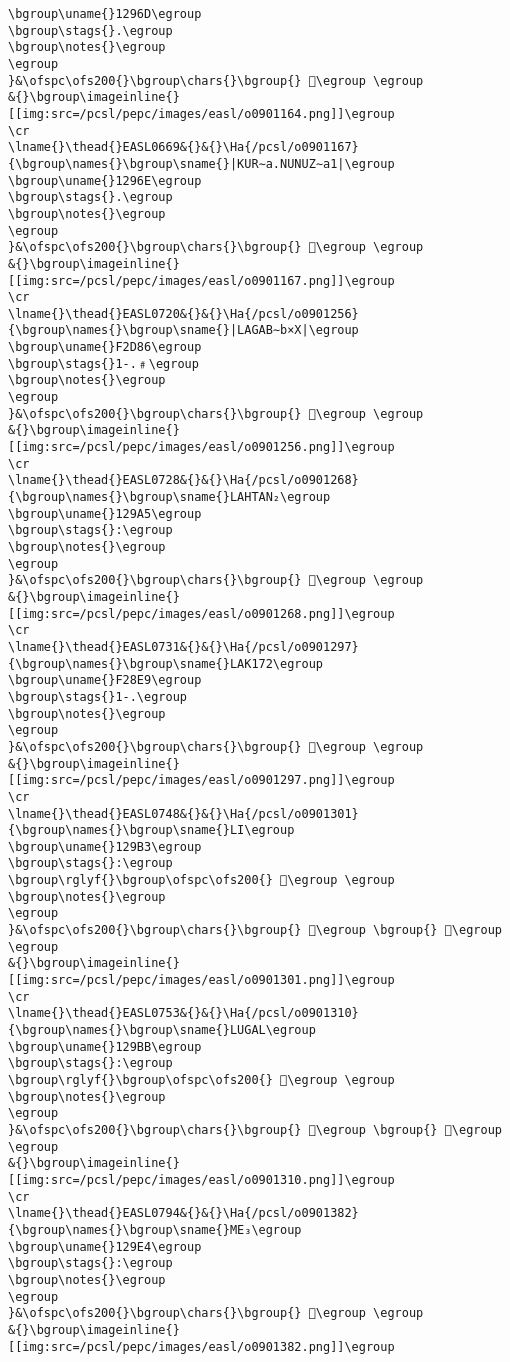 \begin{verbatim}
\bgroup\uname{}1296D\egroup
\bgroup\stags{}.\egroup
\bgroup\notes{}\egroup
\egroup
}&\ofspc\ofs200{}\bgroup\chars{}\bgroup{} 𒥭\egroup \egroup
&{}\bgroup\imageinline{}[[img:src=/pcsl/pepc/images/easl/o0901164.png]]\egroup
\cr
\lname{}\thead{}EASL0669&{}&{}\Ha{/pcsl/o0901167}{\bgroup\names{}\bgroup\sname{}|KUR∼a.NUNUZ∼a1|\egroup
\bgroup\uname{}1296E\egroup
\bgroup\stags{}.\egroup
\bgroup\notes{}\egroup
\egroup
}&\ofspc\ofs200{}\bgroup\chars{}\bgroup{} 𒥮\egroup \egroup
&{}\bgroup\imageinline{}[[img:src=/pcsl/pepc/images/easl/o0901167.png]]\egroup
\cr
\lname{}\thead{}EASL0720&{}&{}\Ha{/pcsl/o0901256}{\bgroup\names{}\bgroup\sname{}|LAGAB∼b×X|\egroup
\bgroup\uname{}F2D86\egroup
\bgroup\stags{}1-.﹟\egroup
\bgroup\notes{}\egroup
\egroup
}&\ofspc\ofs200{}\bgroup\chars{}\bgroup{} 󲶆\egroup \egroup
&{}\bgroup\imageinline{}[[img:src=/pcsl/pepc/images/easl/o0901256.png]]\egroup
\cr
\lname{}\thead{}EASL0728&{}&{}\Ha{/pcsl/o0901268}{\bgroup\names{}\bgroup\sname{}LAHTAN₂\egroup
\bgroup\uname{}129A5\egroup
\bgroup\stags{}:\egroup
\bgroup\notes{}\egroup
\egroup
}&\ofspc\ofs200{}\bgroup\chars{}\bgroup{} 𒦥\egroup \egroup
&{}\bgroup\imageinline{}[[img:src=/pcsl/pepc/images/easl/o0901268.png]]\egroup
\cr
\lname{}\thead{}EASL0731&{}&{}\Ha{/pcsl/o0901297}{\bgroup\names{}\bgroup\sname{}LAK172\egroup
\bgroup\uname{}F28E9\egroup
\bgroup\stags{}1-.\egroup
\bgroup\notes{}\egroup
\egroup
}&\ofspc\ofs200{}\bgroup\chars{}\bgroup{} 󲣩\egroup \egroup
&{}\bgroup\imageinline{}[[img:src=/pcsl/pepc/images/easl/o0901297.png]]\egroup
\cr
\lname{}\thead{}EASL0748&{}&{}\Ha{/pcsl/o0901301}{\bgroup\names{}\bgroup\sname{}LI\egroup
\bgroup\uname{}129B3\egroup
\bgroup\stags{}:\egroup
\bgroup\rglyf{}\bgroup\ofspc\ofs200{} 𒦳\egroup \egroup
\bgroup\notes{}\egroup
\egroup
}&\ofspc\ofs200{}\bgroup\chars{}\bgroup{} 𒦳\egroup \bgroup{} 𒦴\egroup \egroup
&{}\bgroup\imageinline{}[[img:src=/pcsl/pepc/images/easl/o0901301.png]]\egroup
\cr
\lname{}\thead{}EASL0753&{}&{}\Ha{/pcsl/o0901310}{\bgroup\names{}\bgroup\sname{}LUGAL\egroup
\bgroup\uname{}129BB\egroup
\bgroup\stags{}:\egroup
\bgroup\rglyf{}\bgroup\ofspc\ofs200{} 𒦻\egroup \egroup
\bgroup\notes{}\egroup
\egroup
}&\ofspc\ofs200{}\bgroup\chars{}\bgroup{} 𒦺\egroup \bgroup{} 𒦻\egroup \egroup
&{}\bgroup\imageinline{}[[img:src=/pcsl/pepc/images/easl/o0901310.png]]\egroup
\cr
\lname{}\thead{}EASL0794&{}&{}\Ha{/pcsl/o0901382}{\bgroup\names{}\bgroup\sname{}ME₃\egroup
\bgroup\uname{}129E4\egroup
\bgroup\stags{}:\egroup
\bgroup\notes{}\egroup
\egroup
}&\ofspc\ofs200{}\bgroup\chars{}\bgroup{} 𒧤\egroup \egroup
&{}\bgroup\imageinline{}[[img:src=/pcsl/pepc/images/easl/o0901382.png]]\egroup

\end{verbatim}
